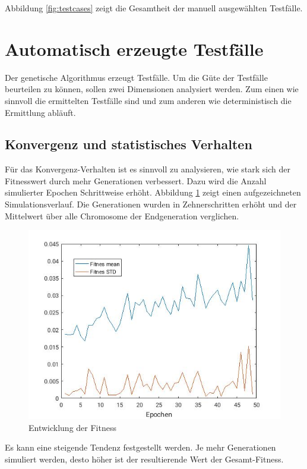 \documentclass[12pt,a4paper]{article}
\begin{document}
Abbildung \ref{fig:testcases} zeigt die Gesamtheit der manuell ausgewählten Testfälle.

\section{Automatisch erzeugte Testfälle}
Der genetische Algorithmus erzeugt Testfälle. Um die Güte der Testfälle beurteilen zu können, sollen zwei Dimensionen analysiert werden. Zum einen wie sinnvoll die ermittelten Testfälle sind und zum anderen wie deterministisch die Ermittlung abläuft.

\subsection{Konvergenz und statistisches Verhalten}
Für das Konvergenz-Verhalten ist es sinnvoll zu analysieren, wie stark sich der Fitnesswert durch mehr Generationen verbessert.
Dazu wird die Anzahl simulierter Epochen Schrittweise erhöht. Abbildung \ref{fig:epochen} zeigt einen aufgezeichneten Simulationsverlauf. Die Generationen wurden in Zehnerschritten erhöht und der Mittelwert über alle Chromosome der Endgeneration verglichen.
\begin{figure}\centering
\includegraphics[width=.6\textwidth]{increasedEpochs.jpg}
\caption{Entwicklung der Fitness}
\label{fig:epochen}
\end{figure}
Es kann eine steigende Tendenz festgestellt werden. Je mehr Generationen simuliert werden, desto höher ist der resultierende Wert der Gesamt-Fitness.
\end{document}
